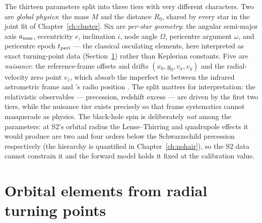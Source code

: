 The thirteen parameters split into three tiers with very different
characters. Two are \emph{global physics}: the mass $M$ and the
distance $R_0$, shared by every star in the joint fit of
Chapter~\ref{ch:cluster}. Six are \emph{per-star geometry}: the
angular semi-major axis $a_{\rm mas}$, eccentricity $e$, inclination
$i$, node angle $\Omega$, pericentre argument $\omega$, and pericentre
epoch $t_{\rm peri}$ — the classical osculating elements, here
interpreted as exact turning-point data (Section~\ref{sec:darwin})
rather than Keplerian constants. Five are \emph{nuisance}: the
reference-frame offsets and drifts $(x_0, y_0, v_x, v_y)$ and the
radial-velocity zero point $v_z$, which absorb the imperfect tie
between the infrared astrometric frame and \sgra{}'s radio position
\citep{Plewa2015}. The split matters for interpretation: the
relativistic observables — precession, redshift excess — are driven
by the first two tiers, while the nuisance tier exists precisely so
that frame systematics cannot masquerade as physics. The black-hole
spin is deliberately \emph{not} among the parameters: at S2's orbital
radius the Lense--Thirring and quadrupole effects it would produce
are two and four orders below the Schwarzschild precession
respectively (the hierarchy is quantified in
Chapter~\ref{ch:nohair}), so the S2 data cannot constrain it and the
forward model holds it fixed at the calibration value.

\section{Orbital elements from radial turning points}
\label{sec:darwin}

